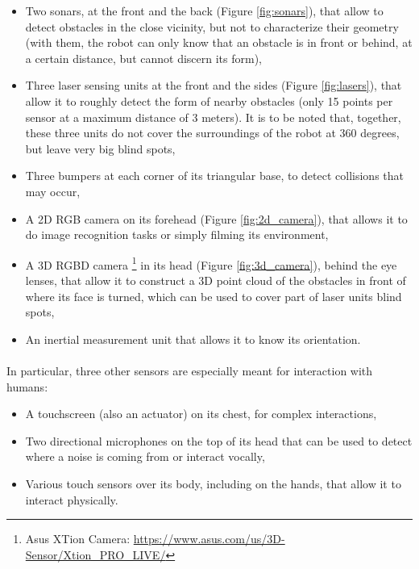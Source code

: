 \begin{itemize}
  \item Two sonars, at the front and the back (Figure \ref{fig:sonars}), that allow to detect obstacles in the close vicinity, but not to characterize their geometry (with them, the robot can only know that an obstacle is in front or behind, at a certain distance, but cannot discern its form),
  \item Three laser sensing units at the front and the sides (Figure \ref{fig:lasers}), that allow it to roughly detect the form of nearby obstacles (only 15 points per sensor at a maximum distance of 3 meters). It is to be noted that, together, these three units do not cover the surroundings of the robot at 360 degrees, but leave very big blind spots,
  \item Three bumpers at each corner of its triangular base, to detect collisions that may occur,
  \item A 2D RGB camera on its forehead (Figure \ref{fig:2d_camera}), that allows it to do image recognition tasks or simply filming its environment,
  \item A 3D RGBD camera \footnote{Asus XTion Camera: \url{https://www.asus.com/us/3D-Sensor/Xtion_PRO_LIVE/}} in its head (Figure \ref{fig:3d_camera}), behind the eye lenses, that allow it to construct a 3D point cloud of the obstacles in front of where its face is turned, which can be used to cover part of laser units blind spots,
  \item An inertial measurement unit that allows it to know its orientation.
\end{itemize}

\paragraph{} In particular, three other sensors are especially meant for interaction with humans:

\begin{itemize}
  \item A touchscreen (also an actuator) on its chest, for complex interactions,
  \item Two directional microphones on the top of its head that can be used to detect where a noise is coming from or interact vocally,
  \item Various touch sensors over its body, including on the hands, that allow it to interact physically.
\end{itemize}

